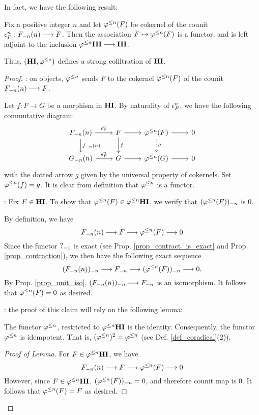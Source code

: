 In fact, we have the following result:

\begin{prop}\label{prop_HI_lower_slice}
Fix a positive integer $n$ and let $\tlHI{n}(F)$ be cokernel of the 
counit $\cuHI^n_F: \LHI[n]{\RHI[n]{F}} \to F$. Then the 
association $F \mapsto \tlHI{n}(F)$ is a functor, and is left 
adjoint to the inclusion $\tlHI{n}\HI \to \HI$.

Thus, $(\HI, \tlHI{*})$ defines a strong cofiltration
of $\HI$.
\end{prop}
\begin{proof}
 : on objects, $\tlHI{n}$ sends $F$ to the 
cokernel $\tlHI{n}(F)$ of the counit $\LHI[n]{\RHI[n]{F}} \to F$.

Let $f: F \to G$ be a morphism in $\HI$.
By naturality of $\cuHI^n_F$, we have the following commutative
diagram:
\[
\begin{tikzcd}
\LHI[n]{\RHI[n]{F}} \arrow{r}{\cuHI_F^n} \arrow{d}{\LHI[n]{\RHI[n]{f}}}
& F \arrow{r} \arrow{d}{f}
& \tlHI{n}(F) \arrow[dotted]{d}{g} \arrow{r}
& 0 \\
\LHI[n]{\RHI[n]{G}} \arrow{r}{\cuHI_F^n}
& G \arrow{r}
& \tlHI{n}(G) \arrow{r}
& 0
\end{tikzcd}
\]
with the dotted arrow $g$ given by the universal property of 
cokernels. Set $\tlHI{n}(f) = g$. It is clear from definition that
$\tlHI{n}$ is a functor.

 : Fix $F \in \HI$. To
show that $\tlHI{n}(F) \in \tlHI{n}\HI$, we verify that 
$\RHI[n]{(\tlHI{n}(F))}$ is 0.

By definition, we have
\[
\LHI[n]{\RHI[n]{F}} \to F \to \tlHI{n}(F) \to 0
\]
Since the functor $\RHI{?}$ is exact (see Prop. 
\ref{prop_contract_is_exact} and Prop. \ref{prop_contraction}), 
we then have the following exact sequence
\[
\RHI[n]{(\LHI[n]{\RHI[n]{F}})} \to \RHI[n]{F} \to
\RHI[n]{(\tlHI{n}(F))} \to 0.
\]
By Prop. \ref{prop_unit_iso}, $\RHI[n]{(\LHI[n]{\RHI[n]{F}})}
\to \RHI[n]{F}$ is an isomorphism. It follows that $\tlHI{n}(F) = 
0$ as desired.

 : the proof
of this claim will rely on the following lemma:

\begin{lem}\label{lem_tlHI_id}
The functor $\tlHI{n}$, restricted to $\tlHI{n}\HI$ is the 
identity. Consequently, the functor $\tlHI{n}$ is idempotent. 
That is, $(\tlHI{n})^2 = \tlHI{n}$ (see Def. 
\ref{def_coradical}(2)).
\end{lem}
\begin{proof}[Proof of Lemma]
For $F \in \tlHI{n}\HI$, we have
\[
\LHI[n]{\RHI[n]{F}} \to F \to \tlHI{n}(F) \to 0
\]
However, since $F \in \tlHI{n}\HI$, $\RHI[n]{(\tlHI{n}(F))} = 0$, 
and therefore counit map is $0$. It follows that $\tlHI{n}(F) = F$ 
as desired.


\end{proof}
\end{proof}
